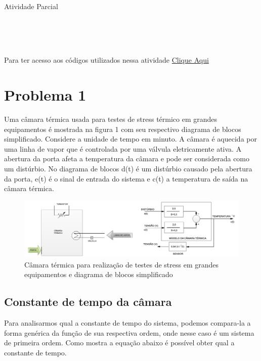 \documentclass[a4paper,12pt]{article}
\begin{document}
	\begin{center}
		\begin{Huge}
			Atividade Parcial
		\end{Huge}
	\end{center}

	\begin{center}
		\\
		\\
		\\
	\end{center}
	
	Para ter acesso aos códigos utilizados nessa atividade \href{https://github.com/Thgm01/ELC220-Controle-Digital/tree/main/Atividade_Parcial_01}{Clique Aqui} 
		
	
	\section{Problema 1}
	Uma câmara térmica usada para testes de stress térmico em grandes equipamentos é mostrada na figura 1 com seu respectivo diagrama de blocos simplificado. Considere a unidade de tempo em minuto. A câmara é aquecida por uma linha de vapor que é controlada por uma válvula eletricamente ativa. A abertura da porta afeta a temperatura da câmara e pode ser considerada como um distúrbio. No diagrama de blocos d(t) é um distúrbio causado pela abertura da porta, e(t) é o sinal de entrada do sistema e c(t) a temperatura de saída na câmara térmica.
	

	\begin{figure}[H]
		\centering
		\includegraphics[width=0.9\linewidth]{images/planta_problema1}
		\caption{Câmara térmica para realização de testes de stress em grandes equipamentos e diagrama de blocos simplificado}
		\label{fig:plantaproblema1}
	\end{figure}

	\subsection{Constante de tempo da câmara}
		Para analisarmos qual a constante de tempo do sistema, podemos compara-la a forma genérica da função de sua respectiva ordem, onde nesse caso é um sistema de primeira ordem. Como mostra a equação abaixo é possível obter qual a constante de tempo.
	
\end{document}
